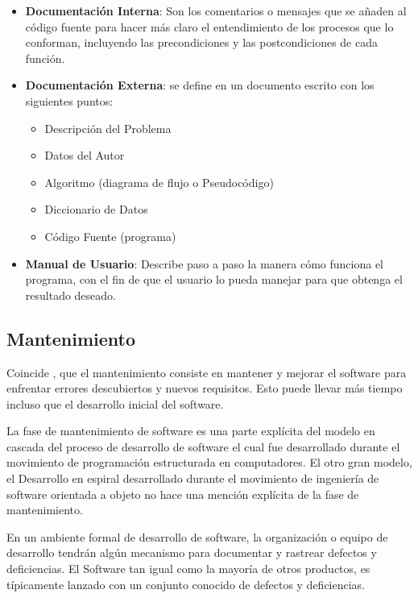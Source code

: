 \documentclass[12pt]{article}
\begin{document}
	\begin{itemize}[label=\textbullet, leftmargin=1.27cm]
		\item \textbf{Documentación Interna}: Son los comentarios o mensajes que se añaden al código fuente para hacer más claro el entendimiento de los procesos que lo conforman, incluyendo las precondiciones y las postcondiciones de cada función.
		\item \textbf{Documentación Externa}: se define en un documento escrito con los siguientes puntos:
			\begin{itemize}[label=○]
				\item Descripción del Problema
				\item Datos del Autor
				\item Algoritmo (diagrama de flujo o Pseudocódigo)
				\item Diccionario de Datos
				\item Código Fuente (programa)
			\end{itemize}
		\item \textbf{Manual de Usuario}: Describe paso a paso la manera cómo funciona el programa, con el fin de que el usuario lo pueda manejar para que obtenga el resultado deseado.
	\end{itemize}

	\subsection{Mantenimiento}

	\hspace{1.27cm}Coincide \textcite{maida_metodologias_2015}, que el mantenimiento consiste en mantener y mejorar el software para enfrentar errores descubiertos y nuevos requisitos. Esto puede llevar más tiempo incluso que el desarrollo inicial del software.

	\hspace{1.27cm}La fase de mantenimiento de software es una parte explícita del modelo en cascada del proceso de desarrollo de software el cual fue desarrollado durante el movimiento de programación estructurada en computadores. El otro gran modelo, el Desarrollo en espiral desarrollado durante el movimiento de ingeniería de software orientada a objeto no hace una mención explícita de la fase de mantenimiento.

	\hspace{1.27cm}En un ambiente formal de desarrollo de software, la organización o equipo de desarrollo tendrán algún mecanismo para documentar y rastrear defectos y deficiencias. El Software tan igual como la mayoría de otros productos, es típicamente lanzado con un conjunto conocido de defectos y deficiencias.
\end{document}

